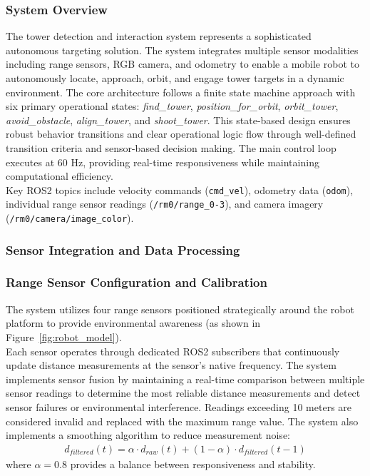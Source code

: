 \subsubsection{System Overview}
The tower detection and interaction system represents a sophisticated autonomous targeting solution. The system integrates multiple sensor modalities including range sensors, RGB camera, and odometry to enable a mobile robot to autonomously locate, approach, orbit, and engage tower targets in a dynamic environment.
The core architecture follows a finite state machine approach with six primary operational states: \textit{find\_tower}, \textit{position\_for\_orbit}, \textit{orbit\_tower}, \textit{avoid\_obstacle}, \textit{align\_tower}, and \textit{shoot\_tower}. This state-based design ensures robust behavior transitions and clear operational logic flow through well-defined transition criteria and sensor-based decision making.
The main control loop executes at 60 Hz, providing real-time responsiveness while maintaining computational efficiency. \\
Key ROS2 topics include velocity commands (\texttt{cmd\_vel}), odometry data (\texttt{odom}), individual range sensor readings (\texttt{/rm0/range\_{0-3}}), and camera imagery (\texttt{/rm0/camera/image\_color}).
\subsubsection{Sensor Integration and Data Processing}
\subsubsection*{Range Sensor Configuration and Calibration}
The system utilizes four range sensors positioned strategically around the robot platform to provide environmental awareness (as shown in Figure~\ref{fig:robot_model}).\\
Each sensor operates through dedicated ROS2 subscribers that continuously update distance measurements at the sensor's native frequency. The system implements sensor fusion by maintaining a real-time comparison between multiple sensor readings to determine the most reliable distance measurements and detect sensor failures or environmental interference.
Readings exceeding 10 meters are considered invalid and replaced with the maximum range value. The system also implements a smoothing algorithm to reduce measurement noise:
\begin{align}
d_{filtered}(t) = \alpha \cdot d_{raw}(t) + (1-\alpha) \cdot d_{filtered}(t-1)
\end{align}
where $\alpha = 0.8$ provides a balance between responsiveness and stability.

